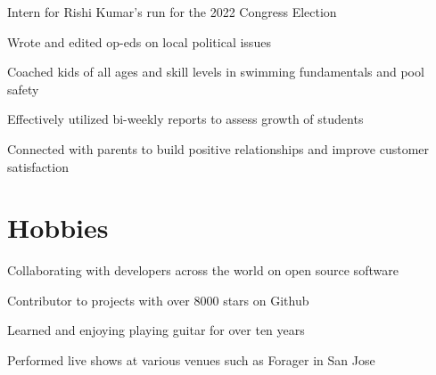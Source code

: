 \documentclass[letterpaper]{resume-shreeram}
\begin{document}
\begin{compactitem}
    \item Intern for Rishi Kumar's run for the 2022 Congress Election

    \item Wrote and edited op-eds on local political issues
\end{compactitem}

\begin{compactitem}
    \item Coached kids of all ages and skill levels in swimming
      fundamentals and pool safety

    \item Effectively utilized bi-weekly reports to assess growth of
      students

    \item Connected with parents to build positive relationships and
      improve customer satisfaction
\end{compactitem}

\section{Hobbies}

\begin{compactitem}
  \item Collaborating with developers across the world on open source
    software

  \item Contributor to projects with over 8000 stars on Github
\end{compactitem}

\begin{compactitem}
  \item Learned and enjoying playing guitar for over ten years

  \item Performed live shows at various venues such as Forager in San
    Jose
\end{compactitem}
\end{document}
